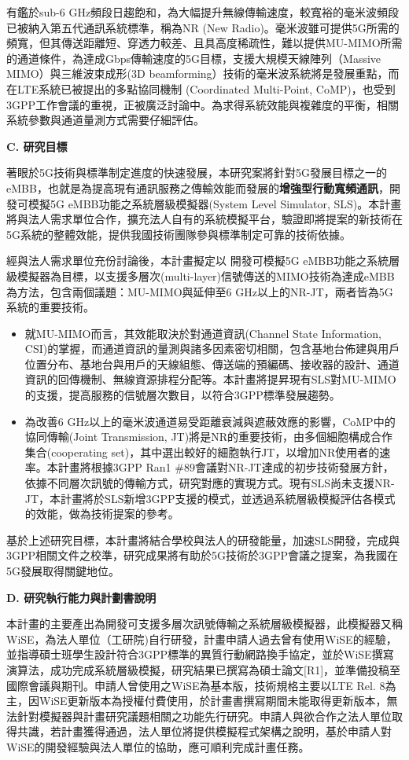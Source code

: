 \documentclass[a4paper,12pt]{article}%
\newcommand\n{\mbox{\quad}} %
\begin{document}
\n 有鑑於sub-6 GHz頻段日趨飽和，為大幅提升無線傳輸速度，較寬裕的毫米波頻段已被納入第五代通訊系統標準，稱為NR (New Radio)。毫米波雖可提供5G所需的頻寬，但其傳送距離短、穿透力較差、且具高度稀疏性，難以提供MU-MIMO所需的通道條件，為達成Gbps傳輸速度的5G目標，支援大規模天線陣列（Massive MIMO）與三維波束成形(3D beamforming）技術的毫米波系統將是發展重點，而在LTE系統已被提出的多點協同機制 (Coordinated Multi-Point, CoMP)，也受到3GPP工作會議的重視，正被廣泛討論中。為求得系統效能與複雜度的平衡，相關系統參數與通道量測方式需要仔細評估。

\noindent \textbf{C. 研究目標}

\n 著眼於5G技術與標準制定進度的快速發展，本研究案將針對5G發展目標之一的eMBB，也就是為提高現有通訊服務之傳輸效能而發展的\textbf{增強型行動寬頻通訊}，開發可模擬5G eMBB功能之系統層級模擬器(System Level Simulator, SLS)。本計畫將與法人需求單位合作，擴充法人自有的系統模擬平台，驗證即將提案的新技術在5G系統的整體效能，提供我國技術團隊參與標準制定可靠的技術依據。

經與法人需求單位充份討論後，本計畫擬定以	開發可模擬5G eMBB功能之系統層級模擬器為目標，以支援多層次(multi-layer)信號傳送的MIMO技術為達成eMBB為方法，包含兩個議題：MU-MIMO與延伸至6 GHz以上的NR-JT，兩者皆為5G系統的重要技術。

\begin{itemize}
\item 就MU-MIMO而言，其效能取決於對通道資訊(Channel State Information, CSI)的掌握，而通道資訊的量測與諸多因素密切相關，包含基地台佈建與用戶位置分布、基地台與用戶的天線組態、傳送端的預編碼、接收器的設計、通道資訊的回傳機制、無線資源排程分配等。本計畫將提昇現有SLS對MU-MIMO的支援，提高服務的信號層次數目，以符合3GPP標準發展趨勢。
\item 為改善6 GHz以上的毫米波通道易受距離衰減與遮蔽效應的影響，CoMP中的協同傳輸(Joint Transmission, JT)將是NR的重要技術，由多個細胞構成合作集合(cooperating set)，其中選出較好的細胞執行JT，以增加NR使用者的速率。本計畫將根據3GPP Ran1 $\#89$會議對NR-JT達成的初步技術發展方針，依據不同層次訊號的傳輸方式，研究對應的實現方式。現有SLS尚未支援NR-JT，本計畫將於SLS新增3GPP支援的模式，並透過系統層級模擬評估各模式的效能，做為技術提案的參考。
\end{itemize}

基於上述研究目標，本計畫將結合學校與法人的研發能量，加速SLS開發，完成與3GPP相關文件之校準，研究成果將有助於5G技術於3GPP會議之提案，為我國在5G發展取得關鍵地位。

\noindent \textbf{D. 研究執行能力與計劃書說明}

本計畫的主要產出為開發可支援多層次訊號傳輸之系統層級模擬器，此模擬器又稱WiSE，為法人單位（工研院)自行研發，計畫申請人過去曾有使用WiSE的經驗，並指導碩士班學生設計符合3GPP標準的異質行動網路換手協定，並於WiSE撰寫演算法，成功完成系統層級模擬，研究結果已撰寫為碩士論文[R1]，並準備投稿至國際會議與期刊。申請人曾使用之WiSE為基本版，技術規格主要以LTE Rel. 8為主，因WiSE更新版本為授權付費使用，於計畫書撰寫期間未能取得更新版本，無法針對模擬器與計畫研究議題相關之功能先行研究。申請人與欲合作之法人單位取得共識，若計畫獲得通過，法人單位將提供模擬程式架構之說明，基於申請人對WiSE的開發經驗與法人單位的協助，應可順利完成計畫任務。
\end{document}
